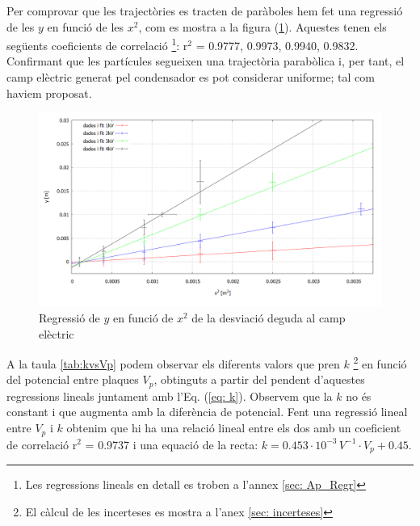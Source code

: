 \documentclass[11pt]{article}
\numberwithin{equation}{section}
\numberwithin{figure}{section}
\numberwithin{table}{section}
\begin{document}
 Per comprovar que les trajectòries es tracten de paràboles hem fet una regressió de les $y$ en funció de les $x^2$, com es mostra a la figura (\ref{fig: Regressió Desv E}). Aquestes tenen els següents coeficients de correlació \footnote{Les regressions lineals en detall es troben a l'annex \ref{sec: Ap_Regr}}:
 r$^2$ = 0.9777, 0.9973, 0.9940, 0.9832. Confirmant que les partícules segueixen una trajectòria parabòlica i, per tant, el camp elèctric generat pel condensador es pot considerar uniforme; tal com haviem proposat. 
\begin{figure}[H]
    \centering
    \begin{minipage}{0.75\textwidth}
    \centering
        \includegraphics[width=1\linewidth]{Plot yvsx.PNG}
        \caption{Regressió de $y$ en funció de $x^2$  de la desviació deguda al camp elèctric}
        \label{fig: Regressió Desv E}
    \end{minipage}
\end{figure}

A la taula \ref{tab:kvsVp} podem observar els diferents valors que pren $k$ \footnote{El càlcul de les incerteses es mostra a l'anex \ref{sec: incerteses}} en funció del potencial entre plaques $V_p$, obtinguts a partir del pendent d'aquestes regressions lineals juntament amb l'Eq. (\ref{eq: k}). Observem que la $k$ no és constant i que augmenta amb la diferència de potencial. Fent una regressió lineal entre $V_p$ i $k$ obtenim que hi ha una relació lineal entre els dos amb un coeficient de correlació r$^2$ = 0.9737 i una equació de la recta: $k = 0.453 \cdot 10^{-3}\, V^{-1}  \cdot V_p + 0.45$.
\end{document}
